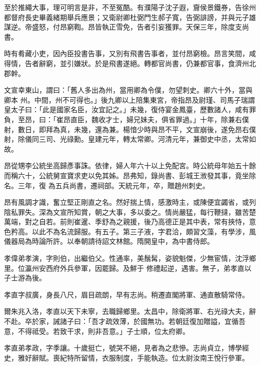 \begin{pinyinscope}
 至於推繩大事，理可明言是非，不至冤酷。有濮陽子沈子遐，齎侯景鐵券，告徐州都督府長史畢義緒期舉兵應景；又衛尉卿杜弼門生郝子寬，告弼誹謗，并與元子雄謀逆。帝盛怒，付昂窮鞫。昂皆執正雪免，告者引妄獲罪。天保三年，除度支尚書。



 時有肴藏小吏，因內臣投書告事，又別有飛書告事者，並付昂窮檢。昂言笑間，咸得情，告者辭窮，並引嫌狀。於是飛書遂絕。轉都官尚書，仍兼都官事，食濟州北郡幹。



 文宣幸東山，謂曰：「舊人多出為州，當用卿為令僕，勿望刺史。卿六十外，當與卿本
 州。中間，州不可得也。」後九卿以上陪集東宮，帝指昂及尉瑾、司馬子瑞謂皇太子曰：「此是國家名臣，汝宜記之。」未幾，復侍宴金鳳臺，歷數諸人，咸有罪負，至昂，曰：「崔昂直臣，魏收才士，婦兄妹夫，俱省罪過。」十年，除兼右僕射，數日，即拜為真，未幾，還為兼。楊愔少時與昂不平，文宣崩後，遂免昂右僕射，除儀同三司、光祿勳。皇建元年，轉太常卿。河清元年，兼御史中丞，太常如故。



 昂從甥李公統坐高歸彥事誅。依律，婦人年六十以上免配宮。時公統母年始五十餘而稱六十，公統舅宣寶求吏以免其姊。昂弗知，錄尚書、彭城王浟發其事，竟坐除名。三年，復
 為五兵尚書，遷祠部。天統元年，卒，贈趙州刺史。



 昂有風調才識，奮立堅正剛直之名。然好揣上情，感激時主，或陳便宜蠲省，或列陰私罪失。深為文宣所知賞，朝之大事，多以委之。情尚嚴猛，每行鞭撻，雖苦楚萬端，對之自若。前則崔暹、季舒為之親援，後乃高德正是其中表，常有挾恃，意色矜高。以此不為名流歸服。有五子。第三子液，字君洽，頗習文藻，有學涉，風儀器局為時論所許。以奉朝請待詔文林館。隋開皇中，為中書侍郎。



 孝偉弟孝演，字則伯，出繼伯父。性通率，美鬚髯，姿貌魁傑，少無宦情，沈浮鄉里。位瀛州安西府外兵參軍，因罷歸。及鮮于
 修禮起逆，遇害。無子，弟孝直以子士游為後。



 孝直字叔廣，身長八尺，眉目疏朗，早有志尚。稍遷直閣將軍、通直散騎常侍。



 爾朱兆入洛，孝直以天下未寧，去職歸鄉里。太昌中，除衛將軍、右光祿大夫，辭不赴。卒於家，誡諸子曰：「吾才疏效薄，於國無功。若朝廷復加贈謚，宜循吾意，不得祗受。若致干求，則非吾意。」子士順，位太府卿。



 孝直弟孝政，字季讓。十歲挺亡，號哭不絕，見者為之悲慘。志尚貞立，博學經史，雅好辭賦。喪紀特所留情，衣服制度，手能執造。位太尉汝南王悅行參軍。




\end{pinyinscope}
